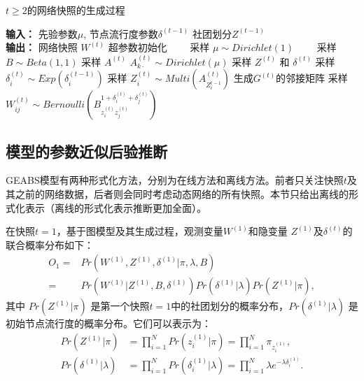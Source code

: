 \begin{algorithm}[H]
\caption{$t \ge 2$的网络快照的生成过程}\label{gent2}
\begin{algorithmic}[1]
\STATE \textbf{输入：} 先验参数$\mu$, 节点流行度参数$\delta^{(t-1)}$ 社团划分$Z^{(t-1)}$ \\
\STATE \textbf{输出：} 网络快照 $W^{(t)}$
\STATE 超参数初始化
\STATE ~~~~采样 $\mu \sim Dirichlet (1)$ 
\STATE ~~~~采样 $B \sim Beta(1,1)$
\STATE 采样 $A^{(t)}$
\STATE $A^{(t)}_{k\cdot} \sim Dirichlet(\mu)$
\ENDFOR
\STATE 采样 $Z^{(t)}$ 和 $\delta^{(t)}$
\STATE 采样 $\delta^{(t)}_i \sim Exp(\delta^{(t-1)}_i)$
\STATE 采样 $Z^{(t)}_i \sim Multi(A^{(t)}_{Z_i^{t-1}})$
\ENDFOR
\STATE 生成$G^{(t)}的邻接矩阵$
\STATE 采样 $W^{(t)}_{ij} \sim Bernoulli(B_{z_i^{(t)} z_j^{(t)}}^{1+\delta_i^{(t)} + \delta_j^{(t)}})$
\ENDFOR
\end{algorithmic}
\end{algorithm}

\subsection{模型的参数近似后验推断}



GEABS模型有两种形式化方法，分别为在线方法和离线方法。前者只关注快照$t$及其之前的网络数据，后者则会同时考虑动态网络的所有快照。本节只给出离线的形式化表示（离线的形式化表示推断更加全面）。

在快照$t=1$，基于图模型及其生成过程，观测变量$W^{(1)}$和隐变量 $Z^{(1)}$及$\delta^{(t)}$的联合概率分布如下：
\begin{align}
O_1 = & Pr(W^{(1)}, Z^{(1)}, \delta^{(1)} |\pi, \lambda, B) \nonumber\\
= & Pr(W^{(1)}|Z^{(1)},B,\delta^{(1)})  Pr(\delta^{(1)}|\lambda) Pr(Z^{(1)}|\pi),
\label{eq:O1}
\end{align}
其中 $Pr(Z^{(1)} | \pi)$ 是第一个快照$t=1$中的社团划分的概率分布，$Pr(\delta^{(1)} | \lambda)$ 是初始节点流行度的概率分布。它们可以表示为：
\begin{align}
Pr (Z^{(1)}|\pi) &= \prod_{i=1}^{N} Pr(z_i^{(1)}|\pi) = \prod_{i=1}^{N} \pi_{z_i^{(1)}}, 
\label{eq:O6}\\
Pr (\delta^{(1)}|\lambda)  &= \prod_{i=1}^{N} Pr(\delta_i^{(1)}|\lambda)
 = \prod_{i=1}^{N} \lambda e^{-\lambda \delta_i^{(1)}}. 
\label{eq:O7}
\end{align}

